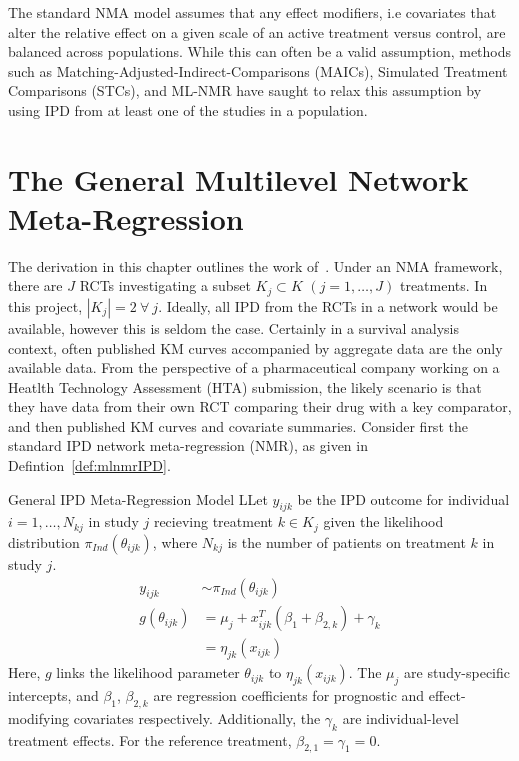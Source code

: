 The standard NMA model assumes that any effect modifiers, i.e covariates that alter the relative effect on a given scale of an active treatment versus control, are balanced across populations. While this can often be a valid assumption, methods such as Matching-Adjusted-Indirect-Comparisons (MAICs), Simulated Treatment Comparisons (STCs), and ML-NMR have saught to relax this assumption by using IPD from at least one of the studies in a population.

\section{The General Multilevel Network Meta-Regression}
The derivation in this chapter outlines the work of~\cite{phillippo2024}. Under an NMA framework, there are $J$ RCTs investigating a subset $K_j \subset K$ $(j = 1,\ldots,J)$ treatments. In this project, $|K_j| = 2 \ \forall \ j$. Ideally, all IPD from the RCTs in a network would be available, however this is seldom the case. Certainly in a survival analysis context, often published KM curves accompanied by aggregate data are the only available data. From the perspective of a pharmaceutical company working on a Heatlth Technology Assessment (HTA) submission, the likely scenario is that they have data from their own RCT comparing their drug with a key comparator, and then published KM curves and covariate summaries. Consider first the standard IPD network meta-regression (NMR), as given in Defintion~\ref{def:mlnmrIPD}.

\begin{definition}[label=def:mlnmrIPD]{General IPD Meta-Regression Model}
    LLet $y_{ijk}$ be the IPD outcome for individual $i = 1, \ldots, N_{kj}$ in study $j$ recieving treatment $k \in K_j$ given the likelihood distribution $\pi_{Ind}(\theta_{ijk})$, where $N_{kj}$ is the number of patients on treatment $k$ in study $j$.
    \begin{align*}
        y_{ijk} &\sim \pi_{Ind}(\theta_{ijk}) \\
        g(\theta_{ijk}) &= \mu_j + x^T_{ijk}(\beta_1 + \beta_{2,k}) + \gamma_k \\
                        &= \eta_{jk}(x_{ijk})
    \end{align*}
    Here, $g$ links the likelihood parameter $\theta_{ijk}$ to $\eta_{jk}(x_{ijk})$. The $\mu_j$ are study-specific intercepts, and $\beta_1$, $\beta_{2,k}$ are regression coefficients for prognostic and effect-modifying covariates respectively. Additionally, the $\gamma_k$ are individual-level treatment effects. For the reference treatment, $\beta_{2,1} = \gamma_1 = 0$.
\end{definition}


